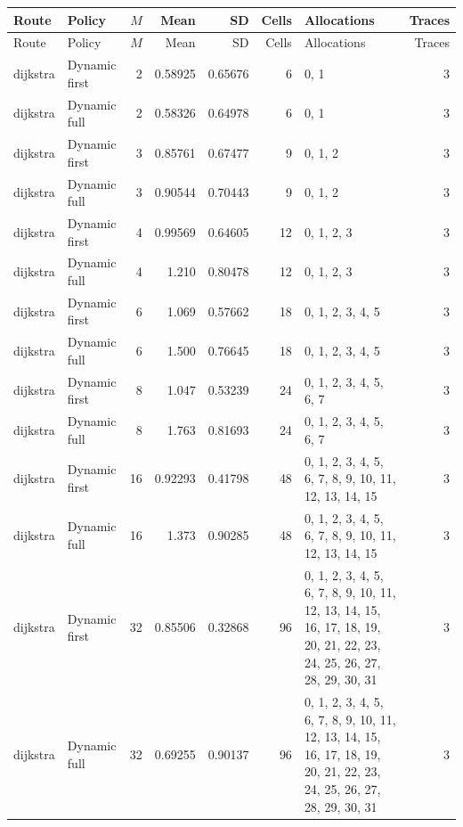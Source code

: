 \documentclass[10pt,a4paper]{article}
\begin{document}
\tiny\setlength{\tabcolsep}{2pt}\begin{longtable}{@{}p{23mm}p{29mm}rrrrp{36mm}r@{}}
\toprule Route & Policy & $M$ & Mean & SD & Cells & Allocations & Traces \\ \midrule\endfirsthead
\toprule Route & Policy & $M$ & Mean & SD & Cells & Allocations & Traces \\ \midrule\endhead
\bottomrule\endfoot
dijkstra & Dynamic first & 2 & 0.58925 & 0.65676 & 6 & 0, 1 & 3 \\
dijkstra & Dynamic full & 2 & 0.58326 & 0.64978 & 6 & 0, 1 & 3 \\
dijkstra & Dynamic first & 3 & 0.85761 & 0.67477 & 9 & 0, 1, 2 & 3 \\
dijkstra & Dynamic full & 3 & 0.90544 & 0.70443 & 9 & 0, 1, 2 & 3 \\
dijkstra & Dynamic first & 4 & 0.99569 & 0.64605 & 12 & 0, 1, 2, 3 & 3 \\
dijkstra & Dynamic full & 4 & 1.210 & 0.80478 & 12 & 0, 1, 2, 3 & 3 \\
dijkstra & Dynamic first & 6 & 1.069 & 0.57662 & 18 & 0, 1, 2, 3, 4, 5 & 3 \\
dijkstra & Dynamic full & 6 & 1.500 & 0.76645 & 18 & 0, 1, 2, 3, 4, 5 & 3 \\
dijkstra & Dynamic first & 8 & 1.047 & 0.53239 & 24 & 0, 1, 2, 3, 4, 5, 6, 7 & 3 \\
dijkstra & Dynamic full & 8 & 1.763 & 0.81693 & 24 & 0, 1, 2, 3, 4, 5, 6, 7 & 3 \\
dijkstra & Dynamic first & 16 & 0.92293 & 0.41798 & 48 & 0, 1, 2, 3, 4, 5, 6, 7, 8, 9, 10, 11, 12, 13, 14, 15 & 3 \\
dijkstra & Dynamic full & 16 & 1.373 & 0.90285 & 48 & 0, 1, 2, 3, 4, 5, 6, 7, 8, 9, 10, 11, 12, 13, 14, 15 & 3 \\
dijkstra & Dynamic first & 32 & 0.85506 & 0.32868 & 96 & 0, 1, 2, 3, 4, 5, 6, 7, 8, 9, 10, 11, 12, 13, 14, 15, 16, 17, 18, 19, 20, 21, 22, 23, 24, 25, 26, 27, 28, 29, 30, 31 & 3 \\
dijkstra & Dynamic full & 32 & 0.69255 & 0.90137 & 96 & 0, 1, 2, 3, 4, 5, 6, 7, 8, 9, 10, 11, 12, 13, 14, 15, 16, 17, 18, 19, 20, 21, 22, 23, 24, 25, 26, 27, 28, 29, 30, 31 & 3 \\
\end{longtable}\normalsize\setlength{\tabcolsep}{6pt}
\clearpage
\end{document}
